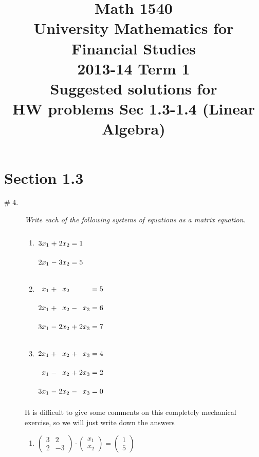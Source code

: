 \documentclass[8pt]{article} %
\title{Math 1540\\University Mathematics for Financial Studies\\2013-14 Term 1\\Suggested solutions for\\HW problems Sec 1.3-1.4 (Linear Algebra)}
\begin{document}
\maketitle
\section{Section 1.3}
\begin{description}
\item[\# 4.]{{\it Write each of the following systems of equations as a matrix equation.}
	\begin{multicols}{3}\begin{enumerate}[label=(\alph*)]
		\item $\arraycolsep=1.4pt\def\arraystretch{2.2}
			\begin{array}[t]{rrrrr}
				3x_1 & + {} & 2x_2 & = & 1\\
				2x_1 & - {} & 3x_2 & = & 5
			\end{array}$
		\item $\arraycolsep=1.4pt\def\arraystretch{2.2}
			\begin{array}[t]{rrrrrrr}
				x_1 & + {} & x_2 & & & = & 5\\
				2x_1 & + {} & x_2 & - {} & x_3 & = & 6\\
				3x_1 & - {} & 2x_2 & + {} & 2x_3 & = & 7
			\end{array}$
		\item $\arraycolsep=1.4pt\def\arraystretch{2.2}
			\begin{array}[t]{rrrrrrr}
				2x_1 & + {} & x_2 & + {} & x_3 & = & 4\\
				x_1 & - {} & x_2 & + {} & 2x_3 & = & 2\\
				3x_1 & - {} & 2x_2 & - {} & x_3 & = & 0
			\end{array}$
	\end{enumerate}\end{multicols}
	It is difficult to give some comments on this completely mechanical exercise, so we will just write down the answers
		\begin{enumerate}[label=(\alph*)]
		\item $\begin{pmatrix}3&2\\2&-3\end{pmatrix}\cdot\begin{pmatrix}x_1\\x_2\end{pmatrix}=\begin{pmatrix}1\\5\end{pmatrix}$

\end{enumerate}}
\end{description}
\end{document}
